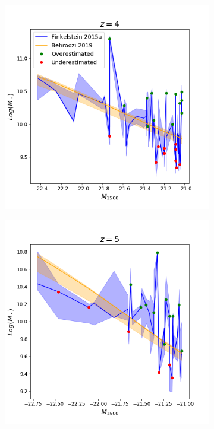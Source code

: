 \begin{figure}[h]
	\begin{subfigure}{.5\textwidth}
  		\centering
  		\includegraphics[width=1.1\linewidth]{Figures/sm-uv/z_4.png}
  		\label{fig:sfig1}
	\end{subfigure}%
	\begin{subfigure}{.5\textwidth}
  		\centering
  		\includegraphics[width=1.1\linewidth]{Figures/sm-uv/z_5.png}

\end{subfigure}
\end{figure}
